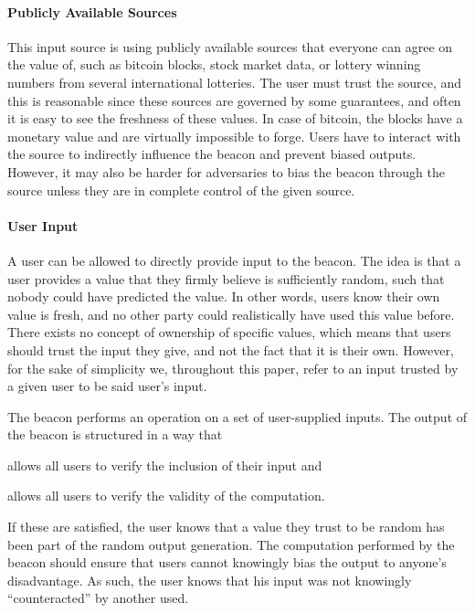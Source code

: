 \paragraph{Publicly Available Sources}
This input source is using publicly available sources that everyone can agree on the value of, such as bitcoin blocks, stock market data, or lottery winning numbers from several international lotteries.
The user must trust the source, and this is reasonable since these sources are governed by some guarantees, and often it is easy to see the freshness of these values.
In case of bitcoin, the blocks have a monetary value and are virtually impossible to forge.
Users have to interact with the source to indirectly influence the beacon and prevent biased outputs.
However, it may also be harder for adversaries to bias the beacon through the source unless they are in complete control of the given source.

\paragraph{User Input}
A user can be allowed to directly provide input to the beacon.
The idea is that a user provides a value that they firmly believe is sufficiently random, such that nobody could have predicted the value.
In other words, users know their own value is fresh, and no other party could realistically have used this value before.
There exists no concept of ownership of specific values, which means that users should trust the input they give, and not the fact that it is their own.
However, for the sake of simplicity we, throughout this paper, refer to an input trusted by a given user to be said user's input.

The beacon performs an operation on a set of user-supplied inputs.
The output of the beacon is structured in a way that
\begin{eletterate*}
    \item allows all users to verify the inclusion of their input and
    \item allows all users to verify the validity of the computation.
\end{eletterate*}

If these are satisfied, the user knows that a value they trust to be random has been part of the random output generation.
The computation performed by the beacon should ensure that users cannot knowingly bias the output to anyone's disadvantage.
As such, the user knows that his input was not knowingly \enquote{counteracted} by another used.

